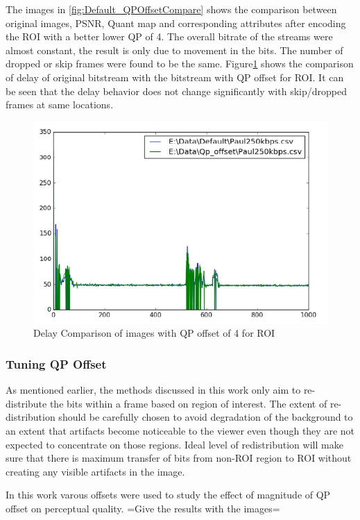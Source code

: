 \documentclass[11pt]{article} %
\begin{document}
The images in \ref{fig:Default_QPOffsetCompare} shows the comparison between original images, PSNR, Quant map and corresponding attributes after encoding the ROI with a better lower QP of 4. The overall bitrate of the streams were almost constant, the result is only due to movement in the bits. The number of dropped or skip frames were found to be the same. Figure\ref{fig:DelayDefault_QPOffsetCompare} shows the comparison of delay of original bitstream with the bitstream with QP offset for ROI. It can be seen that the delay behavior does not change significantly with skip/dropped frames at same locations.

\begin{figure}[!h]
    \centering
    \includegraphics[scale=0.75]{QPOffset/Paul250kbps_QP_Offset_Delay}
    \caption{Delay Comparison of images with QP offset of 4 for ROI}
    \label{fig:DelayDefault_QPOffsetCompare}
\end{figure}
%
\subsubsection{Tuning QP Offset}
As mentioned earlier, the methods discussed in this work only aim to re-distribute the bits within a frame based on region of interest. The extent of re-distribution should be carefully chosen to avoid degradation of the background to an extent that artifacts become noticeable to the viewer even though they are not expected to concentrate on those regions. Ideal level of redistribution will make sure that there is maximum transfer of bits from non-ROI region to ROI without creating any visible artifacts in the image.

In this work varous offsets were used to study the effect of magnitude of QP offset on perceptual quality. =Give the results with the images=
\end{document}
